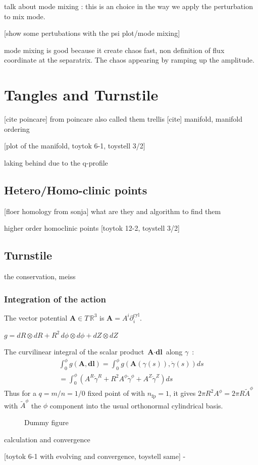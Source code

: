 talk about mode mixing : this is an choice in the way we apply the perturbation to mix mode.

[show some pertubations with the psi plot/mode mixing]

mode mixing is good because it create chaos fast, non definition of flux coordinate at the separatrix. The chaos appearing by ramping up the amplitude.

\chapter{Tangles and Turnstile}

[cite poincare]
from poincare also called them trellis [cite]
manifold, manifold ordering 

[plot of the manifold, toytok 6-1, toystell 3/2]

laking behind due to the q-profile

\section{Hetero/Homo-clinic points}
[floer homology from sonja]
what are they and algorithm to find them

higher order homoclinic points
[toytok 12-2, toystell 3/2]

\section{Turnstile}

the conservation, meiss

\subsection{Integration of the action}

The vector potential $\textbf{A} \in T\,\mathbb{R}^3$ is $\textbf{A} =  A^i\partial_i^\text{cyl}$.

$g = dR\otimes dR + R^2\,d\phi\otimes d\phi + dZ\otimes dZ$

The curvilinear integral of the scalar product $\textbf{A}\cdot\textbf{dl}$ along $\gamma$~:
\begin{align*}
    \int_0^\phi g(\textbf{A},\textbf{dl}) = \int_0^\phi g(\textbf{A}(\gamma(s)),\dot{\gamma}(s))ds\\ = \int_0^\phi (A^R\dot{\gamma}^R + R^2A^\phi\dot{\gamma}^\phi + A^Z\dot{\gamma}^Z) ds
\end{align*}
Thus for a $q=m/n=1/0$ fixed point of with $n_\text{fp} = 1$, it gives $2\pi R^2A^\phi = 2\pi R\tilde{A}^\phi$ with $\tilde{A}^\phi$ the $\phi$ component into the usual orthonormal cylindrical basis.

\begin{figure}[!ht]
    \hfill
    \caption{Dummy figure}
    \label{fig:turnstile-area-sketches}
\end{figure}

calculation and convergence

[toytok 6-1 with evolving and convergence, toystell same]
-
